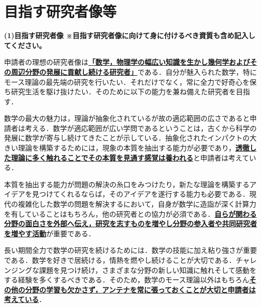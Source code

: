 \documentclass[11pt,a4j,dvipdfmx]{jarticle} 					%
\newcommand{\研究課題名}{象の卵}
\newcommand{\研究機関名}{京都大学}
\newcommand{\研究代表者氏名}{福士　謙二　　　}
\begin{document}




\section{目指す研究者像等}

\noindent
\textbf{(1)目指す研究者像 {\footnotesize ※目指す研究者像に向けて身に付けるべき資質も含め記入してください。}}

申請者の理想の研究者像は\textbf{\ul{「数学，物理学の幅広い知識を生かし幾何学およびその周辺分野の発展に貢献し続ける研究者」}}である．自分が魅入られた数学，特にモース理論の最先端の研究を行いたい．それだけでなく，常に全力で好奇心を保ち研究生活を駆け抜けたい．そのために以下の能力を兼ね備えた研究者を目指す．


\noindent
{}

数学の最大の魅力は，理論が抽象化されているが故の適応範囲の広さであると申請者は考える．数学が適応範囲が広い学問であるということは，古くから科学の発展に数学が寄与し続けてきたことが示している．抽象化されたインパクトの大きい理論を構築するためには，現象の本質を抽出する能力が必要であり，\textbf{\ul{透徹した理論に多く触れることでその本質を見通す感覚は養われる}}と申請者は考えている．


\noindent
{}

本質を抽出する能力が問題の解決の糸口をみつけたり，新たな理論を構築するアイデアを見つけてくれるならば，そのアイデアを遂行する能力も必要である．現代の複雑化した数学の問題を解決するにおいて，自身が数学に造詣が深く計算力を有していることはもちろん，他の研究者との協力が必須である．\textbf{\ul{自らが関わる分野の面白さを外部へ伝え，研究を志すものを増やし分野の参入者や共同研究者を増やす活動}}が重要である．


\noindent
{}

長い期間全力で数学の研究を続けるためには．数学の技能に加え粘り強さが重要である．数学を好きで居続ける，情熱を燃やし続けることが大切である．チャレンジングな課題を見つけ続け，さまざまな分野の新しい知識に触れそして感動をする経験を多くするべきである．そのため，数学のモース理論以外はもちろん\textbf{\ul{その他の分野の学習も欠かさず，アンテナを常に張っておくことが大切と申請者は考えている}}．
\end{document}

